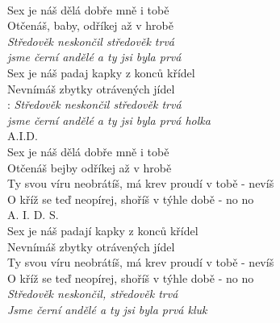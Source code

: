 
\\
Sex je náš dělá dobře mně i tobě\\
Otčenáš, baby, odříkej až v hrobě\\
\emph{Středověk neskončil středověk trvá\\
jsme černí andělé a ty jsi byla prvá}\\

Sex je náš padaj kapky z konců křídel\\
Nevnímáš zbytky otrávených jídel\\

\textregistered: \emph{Středověk neskončil středověk trvá\\
jsme černí andělé a ty jsi byla prvá holka}\\

A.I.D.\\
Sex je náš dělá dobře mně i tobě\\
Otčenáš bejby odříkej až v hrobě\\
Ty svou víru neobrátíš, má krev proudí v tobě - nevíš\\
O kříž se teď neopírej, shoříš v týhle době - no no \textregistered\\

A. I. D. S.\\
Sex je náš padají kapky z konců křídel\\
Nevnímáš zbytky otrávených jídel\\
Ty svou víru neobrátíš, má krev proudí v tobě - nevíš\\
O kříž se teď neopírej, shoříš v týhle době - no no \textregistered \textregistered\\

\emph{Středověk neskončil, středověk trvá\\
Jsme černí andělé a ty jsi byla prvá kluk}

\newpage
